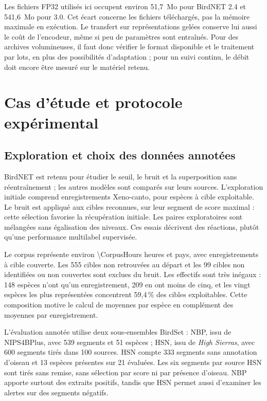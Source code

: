 \documentclass{technology_watch}
\begin{document}
Les fichiers FP32 utilisés ici occupent environ 51,7~Mo pour BirdNET 2.4 et
541,6~Mo pour 3.0. Cet écart concerne les fichiers téléchargés, pas la mémoire
maximale en exécution. Le transfert sur représentations gelées conserve lui
aussi le coût de l'encodeur, même si peu de paramètres sont entraînés.
Pour des archives volumineuses, il faut donc vérifier le format disponible et
le traitement par lots, en plus des possibilités d'adaptation ; pour un suivi
continu, le débit doit encore être mesuré sur le matériel retenu.

\section{Cas d'étude et protocole expérimental}

\subsection{Exploration et choix des données annotées}

BirdNET est retenu pour étudier le seuil, le bruit et la superposition sans
réentraînement ; les autres modèles sont comparés sur leurs sources.
L'exploration initiale comprend \CorpusRecordings{} enregistrements
Xeno-canto, pour \CorpusSpecies{} espèces à cible exploitable. Le bruit est
appliqué aux \NoiseRecordings{} cibles reconnues, sur leur segment de score
maximal : cette sélection favorise la récupération initiale. Les \OverlapPairs{}
paires exploratoires sont mélangées sans égalisation des niveaux. Ces essais
décrivent des réactions, plutôt qu'une performance multilabel supervisée.

Le corpus représente environ \num{\CorpusHours} heures et \CorpusCountries{}
pays, avec \CorpusSupported{} enregistrements à cible couverte. Les 555 cibles
non retrouvées au départ et les 99 cibles non identifiées ou non couvertes
sont exclues du bruit. Les effectifs sont très inégaux : 148 espèces n'ont
qu'un enregistrement, 209 en ont moins de cinq, et les vingt espèces les plus
représentées concentrent 59,4\,\% des cibles exploitables. Cette composition
motive le calcul de moyennes par espèce en complément des moyennes par
enregistrement.

L'évaluation annotée utilise deux sous-ensembles BirdSet\cite{birdsetdata} :
NBP, issu de NIPS4BPlus, avec 539 segments et 51 espèces ; HSN, issu de
\emph{High Sierras}, avec 600 segments tirés dans 100 sources. HSN compte
333 segments sans annotation d'oiseau et 13 espèces présentes sur 21 évaluées.
Les six segments par source HSN sont tirés sans remise, sans sélection par
score ni par présence d'oiseau. NBP apporte surtout des extraits positifs,
tandis que HSN permet aussi d'examiner les alertes sur des segments négatifs.
\end{document}
